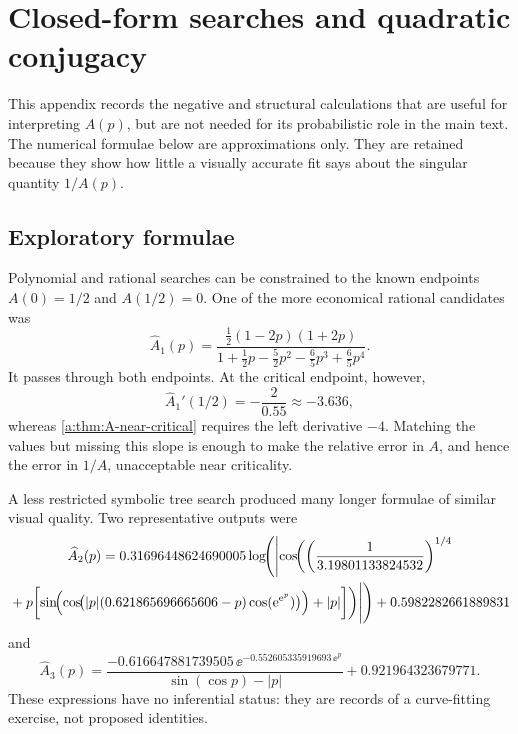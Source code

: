 \section{Closed-form searches and quadratic conjugacy}
\label{a:app:search}
\label{a:app:closed-form-search}

This appendix records the negative and structural calculations that are useful for
interpreting \(A(p)\), but are not needed for its probabilistic role in the main
text.  The numerical formulae below are approximations only.  They are retained
because they show how little a visually accurate fit says about the singular
quantity \(1/A(p)\).

\subsection{Exploratory formulae}

Polynomial and rational searches can be constrained to the known endpoints
\(A(0)=1/2\) and \(A(1/2)=0\).  One of the more economical rational candidates was
\begin{equation}
  \widehat A_1(p)
  =
  \frac{\tfrac12(1-2p)(1+2p)}
       {1+\tfrac12p-\tfrac52p^2-\tfrac65p^3+\tfrac65p^4}.
  \label{a:eq:Ahat1}
\end{equation}
It passes through both endpoints.  At the critical endpoint, however,
\begin{equation}
  \widehat A_1'(1/2)=-\frac{2}{0.55}\approx-3.636,
\end{equation}
whereas \cref{a:thm:A-near-critical} requires the left derivative \(-4\).
Matching the values but missing this slope is enough to make the relative error in
\(A\), and hence the error in \(1/A\), unacceptable near criticality.

A less restricted symbolic tree search produced many longer formulae of similar
visual quality.  Two representative outputs were
\begin{multline}
  \widehat A_2(p)
  =0.31696448624690005
  \log\!\Biggl(
  \Biggl|\cos\!\biggl(
  \left(\frac{1}{3.19801133824532}\right)^{1/4}\\
  {}+p\biggl[
  \sin\!\Bigl(
    \cos\!\bigl(|p|(0.621865696665606-p)
    \cos(\mathrm{e}^{\mathrm{e}^p})\bigr)
  \Bigr)+|p|
  \biggr]\biggr)\Biggr|
  \Biggr)
  +0.5982282661889831
  \label{a:eq:Ahat2}
\end{multline}
and
\begin{equation}
  \widehat A_3(p)
  =
  \frac{-0.616647881739505\,
  \ee^{-0.552605335919693\,\ee^p}}
  {\sin(\cos p)-|p|}
  +0.921964323679771.
  \label{a:eq:Ahat3}
\end{equation}
These expressions have no inferential status: they are records of a curve-fitting
exercise, not proposed identities.

